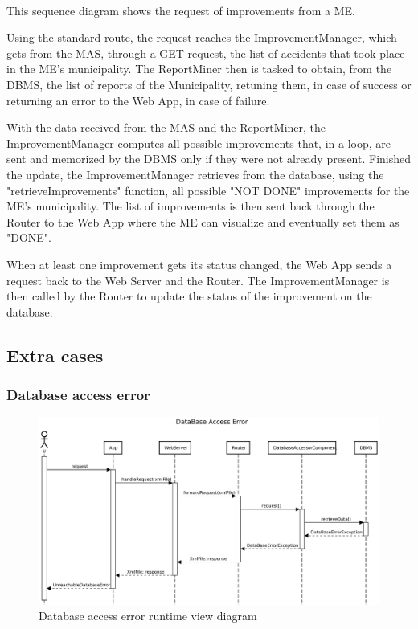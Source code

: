 					\paragraph{}
						This sequence diagram shows the request of improvements from a ME. 
						
						Using the standard route, the request reaches the ImprovementManager, which gets from the MAS, through a GET request, the list of accidents that took place in the ME's municipality. The ReportMiner then is tasked to obtain, from the DBMS, the list of reports of the Municipality, retuning them, in case of success or returning an error to the Web App, in case of failure. 
						
						With the data received from the MAS and the ReportMiner, the ImprovementManager computes all possible improvements that, in a loop, are sent and memorized by the DBMS only if they were not already present. Finished the update, the ImprovementManager retrieves from the database, using the "retrieveImprovements" function, all possible "NOT DONE" improvements for the ME's municipality. The list of improvements is then sent back through the Router to the Web App where the ME can visualize and eventually set them as "DONE". 
						
						When at least one improvement gets its status changed, the Web App sends a request back to the Web Server and the Router. The ImprovementManager is then called by the Router to update the status of the improvement on the database.
			\subsection{Extra cases}
				\subsubsection{Database access error}
					\begin{figure}[!h]
						\centering
						\includegraphics[width=\textwidth]{images/DD2/RuntimeView/Error/dbAccessError.pdf}
						\caption{Database access error runtime view diagram}
					\end{figure}
